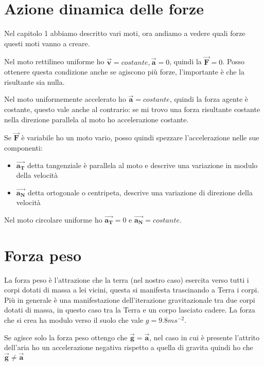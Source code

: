 \documentclass[class=book, crop=false, oneside, 12pt]{standalone}
\begin{document}
\section{Azione dinamica delle forze}

Nel capitolo 1 abbiamo descritto vari moti, ora andiamo a vedere quali forze questi moti vanno a creare.

Nel moto rettilineo uniforme ho \(\overrightarrow{\mathbf{v}} = costante, \overrightarrow{\mathbf{a}} = 0\), quindi la \(\overrightarrow{\mathbf{F}} = 0\).
Posso ottenere questa condizione anche se agiscono più forze, l'importante è che la risultante sia nulla.

Nel moto uniformemente accelerato ho \(\overrightarrow{\mathbf{a}} = costante\), quindi la forza agente è costante, 
questo vale anche al contrario: se mi trovo una forza risultante costante nella direzione parallela al moto ho accelerazione costante.

Se \(\overrightarrow{\mathbf{F}}\) è variabile ho un moto vario, posso quindi spezzare l'accelerazione nelle sue componenti:
\begin{itemize}
    \item \(\overrightarrow{\mathbf{a_T}}\) detta tangenziale è parallela al moto e descrive una variazione in modulo della velocità
    \item \(\overrightarrow{\mathbf{a_N}}\) detta ortogonale o centripeta, descrive una variazione di direzione della velocità
\end{itemize}

Nel moto circolare uniforme ho \(\overrightarrow{\mathbf{a_T}} = 0\) e \(\overrightarrow{\mathbf{a_N}} = costante\).

\section{Forza peso}

La forza peso è l'attrazione che la terra (nel nostro caso) esercita verso tutti i corpi dotati di massa a lei vicini, questa si manifesta trascinando a Terra i corpi. 
Più in generale è una manifestazione dell'iterazione gravitazionale tra due corpi dotati di massa, in questo caso tra la Terra e un corpo lasciato cadere.
La forza che si crea ha modulo verso il suolo che vale \(g = 9.8 ms^{-2}\).

Se agisce solo la forza peso ottengo che \(\overrightarrow{\mathbf{g}} = \overrightarrow{\mathbf{a}}\), 
nel caso in cui è presente l'attrito dell'aria ho un accelerazione negativa rispetto a quella di gravita quindi ho che \(\overrightarrow{\mathbf{g}} \neq \overrightarrow{\mathbf{a}}\)
\end{document}
